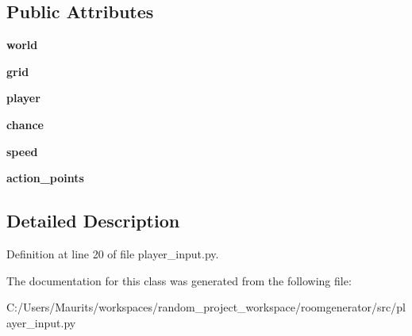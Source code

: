 \subsection*{Public Attributes}
\begin{DoxyCompactItemize}
\item 
\hypertarget{classplayer__input_1_1_object_spawner_a41e40e3231b7ba9e2aa0d26bce72a266}{}{\bfseries world}\label{classplayer__input_1_1_object_spawner_a41e40e3231b7ba9e2aa0d26bce72a266}

\item 
\hypertarget{classplayer__input_1_1_object_spawner_a2a8621cdcfb39f29ad6a0bc41c67b333}{}{\bfseries grid}\label{classplayer__input_1_1_object_spawner_a2a8621cdcfb39f29ad6a0bc41c67b333}

\item 
\hypertarget{classplayer__input_1_1_object_spawner_a058c9f3cd9932bc3f3691731de630d6d}{}{\bfseries player}\label{classplayer__input_1_1_object_spawner_a058c9f3cd9932bc3f3691731de630d6d}

\item 
\hypertarget{classplayer__input_1_1_object_spawner_a1b81443f9495fca149dc4b0f4e61e35c}{}{\bfseries chance}\label{classplayer__input_1_1_object_spawner_a1b81443f9495fca149dc4b0f4e61e35c}

\item 
\hypertarget{classplayer__input_1_1_object_spawner_a74d11c890c7cf0a30adb646d3007a9d5}{}{\bfseries speed}\label{classplayer__input_1_1_object_spawner_a74d11c890c7cf0a30adb646d3007a9d5}

\item 
\hypertarget{classplayer__input_1_1_object_spawner_aac783605e84fc97384582fa231c0ad30}{}{\bfseries action\+\_\+points}\label{classplayer__input_1_1_object_spawner_aac783605e84fc97384582fa231c0ad30}

\end{DoxyCompactItemize}


\subsection{Detailed Description}


Definition at line 20 of file player\+\_\+input.\+py.



The documentation for this class was generated from the following file\+:\begin{DoxyCompactItemize}
\item 
C\+:/\+Users/\+Maurits/workspaces/random\+\_\+project\+\_\+workspace/roomgenerator/src/player\+\_\+input.\+py\end{DoxyCompactItemize}
